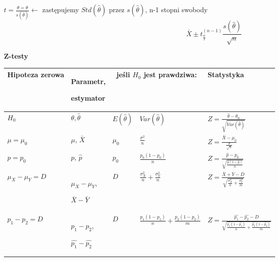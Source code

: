 \documentclass[a4paper]{article}
\begin{document}
    $t = \frac{\hat{\theta} = \theta}{s(\hat{\theta})} \leftarrow$ zastępujemy $Std(\hat{\theta})$ przez $s(\hat{\theta})$,
    n-1 stopni swobody
    \begin{equation*}
        \bar{X} \pm t_{\frac{\alpha}{2}}^{(n-1)} \frac{s(\hat{\theta})}{\sqrt{n}}
    \end{equation*}

    \textbf{Z-testy}

    \begin{table}[H]
        \begin{center}
            \begin{tabular}{ p{2.5cm} |p{2.5cm} |p{1.5cm} |p{4cm} |p{4cm}}
                \toprule
                Hipoteza zerowa & Parametr,

                estymator & \multicolumn{2}{c|}{jeśli $H_0$ jest prawdziwa:} & Statystyka \\
                \toprule

                $H_0$ & $\theta, \hat{\theta}$ & $E(\hat{\theta})$ & $Var(\hat{\theta})$ & $Z = \frac{\hat{\theta} - \theta_0}{\sqrt{Var(\hat{\theta})}}$\\

                \cmidrule(r){1-5}

                $\mu = \mu_0$ & $\mu$, $\bar{X}$ & $\mu_0$ & $\frac{\sigma^2}{n}$ & $Z = \frac{\bar{X} - \mu_0}{\frac{\sigma}{\sqrt{n}}}$\\

                \cmidrule(r){1-5}

                $p = p_0$ & $p$, $\hat{p}$ & $p_0$ & $\frac{p_0(1-p_0)}{n}$ & $Z = \frac{\hat{p} - p_0}{\sqrt{\frac{\hat{p}(1-\hat{p})}{n}}}$\\

                \cmidrule(r){1-5}

                $\mu_X - \mu_Y = D$ &
                $\mu_X - \mu_Y$,

                $\bar{X} - \bar{Y}$
                & $D$ & $\frac{\sigma_X^2}{n} + \frac{\sigma_Y^2}{n}$ & $Z = \frac{\bar{X} + \bar{Y} - D}{\sqrt{\frac{\sigma_X^2}{n} + \frac{\sigma_Y^2}{m}}}$\\

                \cmidrule(r){1-5}

                $p_1 - p_2 = D$ & $p_1 - p_2$,

                $\hat{p_1} - \hat{p_2}$
                & $D$ & $\frac{p_1(1-p_1)}{n} + \frac{p_2(1-p_2)}{m}$ &
                $Z = \frac{\hat{p_1} - \hat{p_2} - D}{\sqrt{\frac{\hat{p_1}(1-\hat{p_1})}{n} + \frac{\hat{p_2}(1-\hat{p_2})}{m}}}$\\


\end{tabular}
\end{center}
\end{table}
\end{document}

